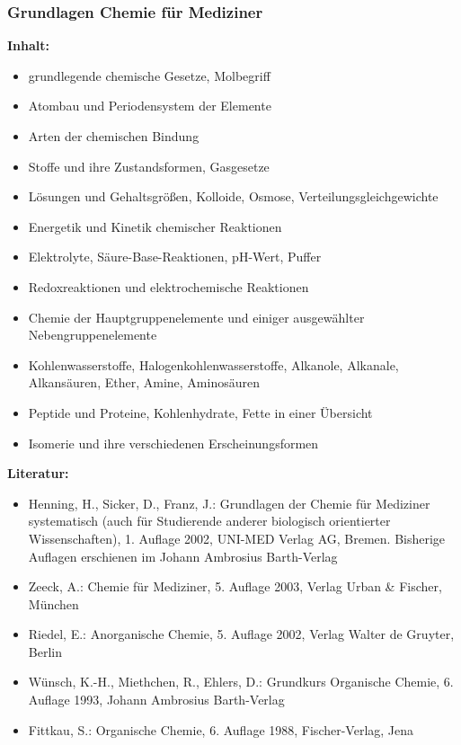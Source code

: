 \documentclass[%
a4paper, %
11pt,               %
leqno,              %
fleqn,              %
]
{scrartcl}
\begin{document}

\subsubsection{Grundlagen Chemie für Mediziner} %
\label{ssub:Grundlagen Chemie für Mediziner}

\textsf{\textbf{Inhalt:}}
\begin{itemize}\itemsep0pt
  \item grundlegende chemische Gesetze, Molbegriff
  \item Atombau und Periodensystem der Elemente
  \item Arten der chemischen Bindung
  \item Stoffe und ihre Zustandsformen, Gasgesetze
  \item Lösungen und Gehaltsgrößen, Kolloide, Osmose, Verteilungsgleichgewichte
  \item Energetik und Kinetik chemischer Reaktionen
  \item Elektrolyte, Säure-Base-Reaktionen, pH-Wert, Puffer
  \item Redoxreaktionen und elektrochemische Reaktionen
  \item Chemie der Hauptgruppenelemente und einiger ausgewählter
    Nebengruppenelemente
  \item Kohlenwasserstoffe, Halogenkohlenwasserstoffe, Alkanole, Alkanale,
    Alkansäuren, Ether, Amine, Aminosäuren
  \item Peptide und Proteine, Kohlenhydrate, Fette in einer Übersicht
  \item Isomerie und ihre verschiedenen Erscheinungsformen
\end{itemize}
\textsf{\textbf{Literatur:}}
\begin{itemize}\itemsep0pt
  \item Henning, H., Sicker, D., Franz, J.: Grundlagen der Chemie für Mediziner
    systematisch (auch für Studierende anderer biologisch orientierter
    Wissenschaften), 1. Auflage 2002, UNI-MED Verlag AG, Bremen. Bisherige
    Auflagen erschienen im Johann Ambrosius Barth-Verlag
  \item Zeeck, A.: Chemie für Mediziner, 5. Auflage 2003, Verlag Urban \&
    Fischer, München
  \item Riedel, E.: Anorganische Chemie, 5. Auflage 2002, Verlag Walter de
    Gruyter, Berlin
  \item Wünsch, K.-H., Miethchen, R., Ehlers, D.: Grundkurs Organische Chemie,
    6. Auflage 1993, Johann Ambrosius Barth-Verlag
  \item Fittkau, S.: Organische Chemie, 6. Auflage 1988, Fischer-Verlag, Jena
\end{itemize}
\end{document}
